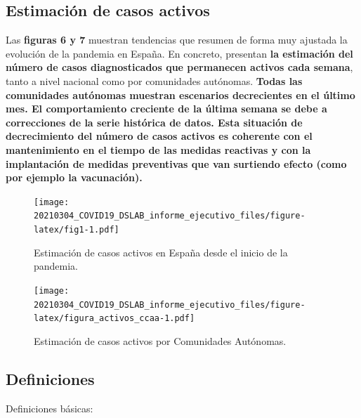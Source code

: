 \documentclass[
  11pt,
]{article}
\begin{document}
\clearpage

\setcounter{page}{9}

\hypertarget{estimaciuxf3n-de-casos-activos}{%
\subsection{Estimación de casos
activos}\label{estimaciuxf3n-de-casos-activos}}

Las \textbf{figuras 6 y 7} muestran tendencias que resumen de forma muy
ajustada la evolución de la pandemia en España. En concreto, presentan
\textbf{la estimación del número de casos diagnosticados que permanecen
activos cada semana}, tanto a nivel nacional como por comunidades
autónomas. \textbf{Todas las comunidades autónomas muestran escenarios
decrecientes en el último mes. El comportamiento creciente de la última
semana se debe a correcciones de la serie histórica de datos. Esta
situación de decrecimiento del número de casos activos es coherente con
el mantenimiento en el tiempo de las medidas reactivas y con la
implantación de medidas preventivas que van surtiendo efecto (como por
ejemplo la vacunación).}

\vspace{0.2cm}

\begin{figure}
\centering
\texttt{[image: 20210304\_COVID19\_DSLAB\_informe\_ejecutivo\_files/figure-latex/fig1-1.pdf]}
\caption{\label{fig:fig17a_res} Estimación de casos activos en España
desde el inicio de la pandemia.}
\end{figure}

\begin{figure}
\centering
\texttt{[image: 20210304\_COVID19\_DSLAB\_informe\_ejecutivo\_files/figure-latex/figura\_activos\_ccaa-1.pdf]}
\caption{\label{fig:figura_activos_ccaa} Estimación de casos activos por
Comunidades Autónomas.}
\end{figure}

\newpage
\setcounter{page}{11}

\hypertarget{definiciones}{%
\subsection{Definiciones}\label{definiciones}}

Definiciones básicas:
\end{document}
